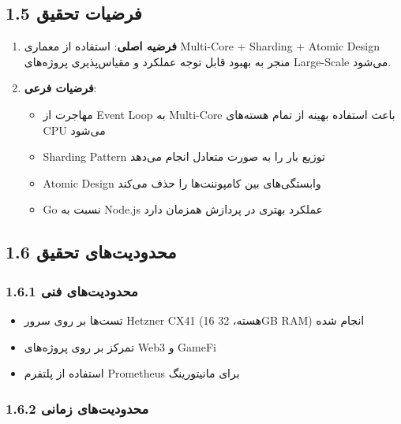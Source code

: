 \documentclass[
]{article}
\providecommand{\tightlist}{%
  \setlength{\itemsep}{0pt}\setlength{\parskip}{0pt}}
\begin{document}
\subsection{1.5 فرضیات
تحقیق}\label{ux641ux631ux636ux6ccux627ux62a-ux62aux62dux642ux6ccux642}

\begin{enumerate}
\def\labelenumi{\arabic{enumi}.}
\item
  \textbf{فرضیه اصلی}: استفاده از معماری Multi-Core + Sharding + Atomic
  Design منجر به بهبود قابل توجه عملکرد و مقیاس‌پذیری پروژه‌های
  Large-Scale می‌شود.
\item
  \textbf{فرضیات فرعی}:

  \begin{itemize}
  \tightlist
  \item
    مهاجرت از Event Loop به Multi-Core باعث استفاده بهینه از تمام
    هسته‌های CPU می‌شود
  \item
    Sharding Pattern توزیع بار را به صورت متعادل انجام می‌دهد
  \item
    Atomic Design وابستگی‌های بین کامپوننت‌ها را حذف می‌کند
  \item
    Go نسبت به Node.js عملکرد بهتری در پردازش همزمان دارد
  \end{itemize}
\end{enumerate}

\subsection{1.6 محدودیت‌های
تحقیق}\label{ux645ux62dux62fux648ux62fux6ccux62aux647ux627ux6cc-ux62aux62dux642ux6ccux642}

\subsubsection{1.6.1 محدودیت‌های
فنی}\label{ux645ux62dux62fux648ux62fux6ccux62aux647ux627ux6cc-ux641ux646ux6cc}

\begin{itemize}
\tightlist
\item
  تست‌ها بر روی سرور Hetzner CX41 (16 هسته، 32GB RAM) انجام شده
\item
  تمرکز بر روی پروژه‌های Web3 و GameFi
\item
  استفاده از پلتفرم Prometheus برای مانیتورینگ
\end{itemize}

\subsubsection{1.6.2 محدودیت‌های
زمانی}\label{ux645ux62dux62fux648ux62fux6ccux62aux647ux627ux6cc-ux632ux645ux627ux646ux6cc}
\end{document}

